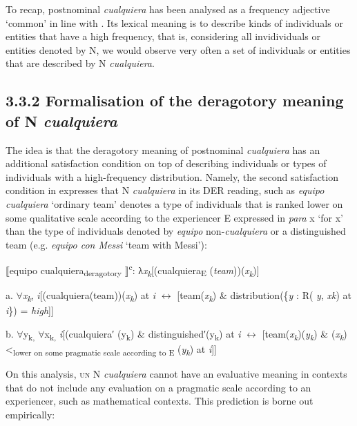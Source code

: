   To recap, postnominal \textit{cualquiera} has been analysed as a frequency adjective ‘common’ in line with \citet{GehrkeMcNally2015}. Its lexical meaning is to describe kinds of individuals or entities that have a high frequency, that is, considering all invidividuals or entities denoted by N, we would observe very often a set of individuals or entities that are described by N \textit{cualquiera}. 

\subsection{\textbf{3.3.2} \textbf{Formalisation} \textbf{of} \textbf{the} \textbf{deragotory} \textbf{meaning} \textbf{of} \textbf{N} \textbf{\textit{cualquiera}}}

The idea is that the deragotory meaning of postnominal \textit{cualquiera} has an additional satisfaction condition on top of describing individuals or types of individuals with a high-frequency distribution. Namely, the second satisfaction condition in  expresses that N \textit{cualquiera} in its DER reading, such as \textit{equipo cualquiera} ‘ordinary team’ denotes a type of individuals that is ranked lower on some qualitative scale according to the experiencer E expressed in \textit{para} x ‘for x’ than the type of individuals denoted by \textit{equipo} non-\textit{cualquiera} or a distinguished team (e.g. \textit{equipo con Messi} ‘team with Messi’):

\label{bkm:Ref58094203}  ⟦equipo cualquiera\textsubscript{deragotory} ⟧\textsuperscript{c}: λ\textit{x\textsubscript{k}}[(cualquiera\textsubscript{E} (\textit{team}))(\textit{x\textsubscript{k}})]

  a.  ${\forall}$\textit{x\textsubscript{k}}, \textit{i}[(cualquiera(team))(\textit{x\textsubscript{k}}) at \textit{i} $\leftrightarrow $ [team(\textit{x\textsubscript{k}}) \& distribution(\{\textit{y} : R( \textit{y}, \textit{xk}) at \textit{i}\}) = \textit{high}]]

  b.  ${\forall}$y\textsubscript{k,} ${\forall}$x\textsubscript{k,} \textit{i}[(cualquiera′ (y\textsubscript{k}) \& distinguished′(y\textsubscript{k}) at \textit{i} $\leftrightarrow $ [team(\textit{x\textsubscript{k}})(\textit{y\textsubscript{k}}) \& (\textit{x\textsubscript{k}}) <\textsubscript{lower on some pragmatic scale according to E} (\textit{y\textsubscript{k}}) at \textit{i}]]

On this analysis, \textsc{un} N \textit{cualquiera} cannot have an evaluative meaning in contexts that do not include any evaluation on a pragmatic scale according to an experiencer, such as mathematical contexts. This prediction is borne out empirically:

